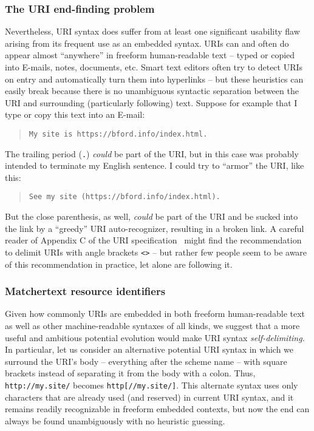 \subsubsection{The URI end-finding problem}

Nevertheless, 
URI syntax does suffer from at least one significant usability flaw
arising from its frequent use as an embedded syntax.
URIs can and often do appear almost ``anywhere''
in freeform human-readable text --
\eg typed or copied into E-mails, notes, documents, etc.
Smart text editors often try to detect URIs on entry
and automatically turn them into hyperlinks --
but these heuristics can easily break because
there is no unambiguous syntactic separation between the URI
and surrounding (particularly following) text.
Suppose for example that I type or copy this text into an E-mail:

\begin{footnotesize}
\begin{quote}
\verb|My site is https://bford.info/index.html.|
\end{quote}
\end{footnotesize}

The trailing period (\verb|.|) \emph{could} be part of the URI,
but in this case was probably intended to terminate my English sentence.
I could try to ``armor'' the URI, like this:

\begin{footnotesize}
\begin{quote}
\verb|See my site (https://bford.info/index.html).|
\end{quote}
\end{footnotesize}

But the close parenthesis, as well, \emph{could} be part of the URI
and be sucked into the link by a ``greedy'' URI auto-recognizer,
resulting in a broken link.
A careful reader of Appendix C of the URI specification~\cite{rfc3986}
might find the recommendation to delimit URIs
with angle brackets \verb|<>| --
but rather few people seem to be aware of this recommendation in practice,
let alone are following it.


\subsubsection{Matchertext resource identifiers}
\label{sec:embed:mri}

Given how commonly URIs are embedded in both freeform human-readable text
as well as other machine-readable syntaxes of all kinds,
we suggest that a more useful and ambitious potential evolution
would make URI syntax \emph{self-delimiting}.
In particular,
let us consider an alternative potential URI syntax
in which we surround the URI's body -- everything after the scheme name --
with square brackets instead of separating it from the body with a colon.
Thus, \verb|http://my.site/| becomes \verb|http[//my.site/]|.
This alternate syntax uses only characters
that are already used (and reserved) in current URI syntax,
and it remains readily recognizable in freeform embedded contexts,
but now the end can always be found unambiguously with no heuristic guessing.

